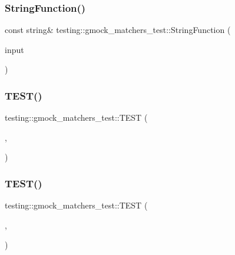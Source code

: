 \subsubsection{\texorpdfstring{String\+Function()}{StringFunction()}}
{\footnotesize\ttfamily const string\& testing\+::gmock\+\_\+matchers\+\_\+test\+::\+String\+Function (\begin{DoxyParamCaption}\item[{const string \&}]{input }\end{DoxyParamCaption})}

\mbox{\label{namespacetesting_1_1gmock__matchers__test_a7bc21ec910c3861034d1336fecfcc260}} 
\subsubsection{\texorpdfstring{T\+E\+S\+T()}{TEST()}\hspace{0.1cm}{\footnotesize\ttfamily [1/292]}}
{\footnotesize\ttfamily testing\+::gmock\+\_\+matchers\+\_\+test\+::\+T\+E\+ST (\begin{DoxyParamCaption}\item[{Match\+Result\+Listener\+Test}]{,  }\item[{Streaming\+Works}]{ }\end{DoxyParamCaption})}

\mbox{\label{namespacetesting_1_1gmock__matchers__test_abc02b215e80c57464c83abdf297b9db7}} 
\subsubsection{\texorpdfstring{T\+E\+S\+T()}{TEST()}\hspace{0.1cm}{\footnotesize\ttfamily [2/292]}}
{\footnotesize\ttfamily testing\+::gmock\+\_\+matchers\+\_\+test\+::\+T\+E\+ST (\begin{DoxyParamCaption}\item[{Match\+Result\+Listener\+Test}]{,  }\item[{Can\+Access\+Underlying\+Stream}]{ }\end{DoxyParamCaption})}

